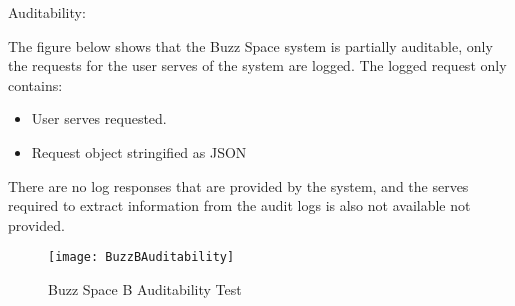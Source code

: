 \item Auditability:

The figure below shows that the Buzz Space system is partially auditable, only the requests for the user serves of the system are logged. The logged request only contains:
\begin{itemize}
\item User serves requested.
\item Request object stringified as JSON
\end{itemize}

There are no log responses that are provided by the system, and the serves required to extract information from the audit logs is also not available not provided.

\begin{figure}[h!]
  \centering
    \texttt{[image: BuzzBAuditability]}
    \caption{Buzz Space B Auditability Test}
\end{figure}
